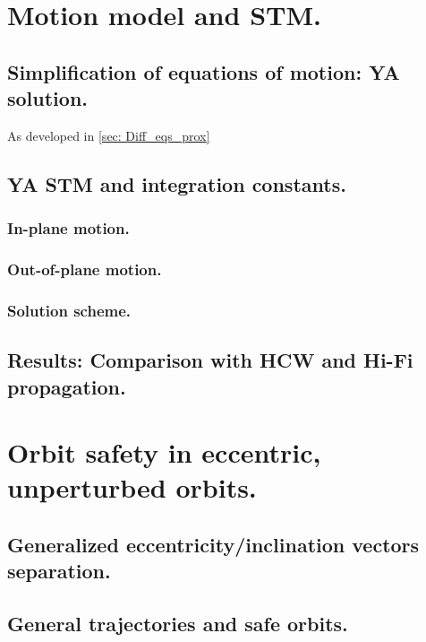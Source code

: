 \section{Motion model and STM.}
%
%
 	\subsection{Simplification of equations of motion: YA solution.}
	\indent As developed in \ref{sec: Diff_eqs_prox}
	\subsection{YA STM and integration constants.}
		\subsubsection{In-plane motion.}
		\subsubsection{Out-of-plane motion.}
		\subsubsection{Solution scheme.}
	\subsection{Results: Comparison with HCW and Hi-Fi propagation.}
\section{Orbit safety in eccentric, unperturbed orbits.}
%
%
	\subsection{Generalized eccentricity/inclination vectors separation.}
	\subsection{General trajectories and safe orbits.}
	
